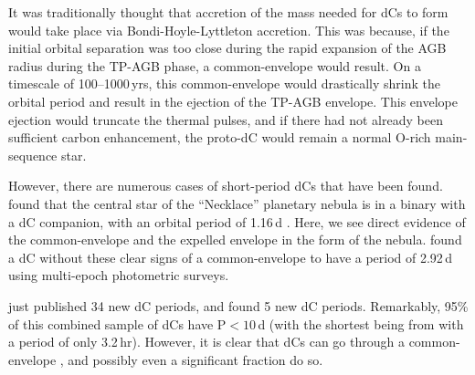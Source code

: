 \documentclass[twocolumn, tighten, times, astrosymb]{aastex631}
\begin{document}
It was traditionally thought that accretion of the mass needed for dCs to form would take place via Bondi-Hoyle-Lyttleton \citep{Hoyle1939, Bondi1944} accretion. This was because, if the initial orbital separation was too close during the rapid expansion of the AGB radius during the TP-AGB phase, a common-envelope \citep{Paczynski1976} would result. On a timescale of 100--1000\,yrs, this common-envelope would drastically shrink the orbital period and result in the ejection of the TP-AGB envelope. This envelope ejection would truncate the thermal pulses, and if there had not already been sufficient carbon enhancement, the proto-dC would remain a normal O-rich main-sequence star. 

However, there are numerous cases of short-period dCs that have been found. \citet{Miszalski2013} found that the central star of the ``Necklace'' planetary nebula is in a binary with a dC companion, with an orbital period of 1.16\,d \citep{Corradi2011}. Here, we see direct evidence of the common-envelope  and the expelled envelope in the form of the nebula. \citet{Margon2018} found a dC without these clear signs of a common-envelope  to have a period of 2.92\,d using multi-epoch photometric surveys. 

\citet{Roulston2021a} just published 34 new dC periods, and \citet{Whitehouse2021} found 5 new dC periods. Remarkably, 95\% of this combined sample of dCs have P$< 10$\,d (with the shortest being from \citet{Roulston2021a} with a period of only 3.2\,hr).  However, it is clear that dCs can go through a common-envelope , and possibly even a significant fraction do so.
\end{document}
